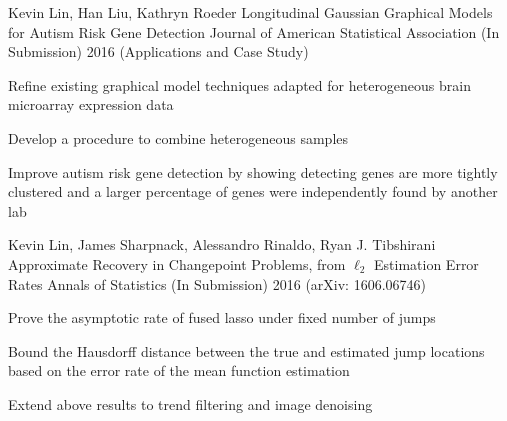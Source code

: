 

\begin{cventries}

\cventry
    {Kevin Lin, Han Liu, Kathryn Roeder} %
    {Longitudinal Gaussian Graphical Models for Autism Risk Gene Detection}
    {Journal of American Statistical Association (In Submission)} %
    {2016 (Applications and Case Study)} %
    {
      \begin{cvitems} %
        \item {Refine existing graphical model techniques adapted for heterogeneous brain microarray expression data}
        \item {Develop a procedure to combine heterogeneous samples}
        \item {Improve autism risk gene detection by showing detecting genes are more tightly clustered
        and a larger percentage of genes were independently found by another lab}
      \end{cvitems}
    }


  \cventry
    {Kevin Lin, James Sharpnack, Alessandro Rinaldo, Ryan J. Tibshirani} %
    {Approximate Recovery in Changepoint Problems, from $\ell_2$
    Estimation Error Rates}
    {Annals of Statistics (In Submission)} %
    {2016 (arXiv: 1606.06746)} %
    {
      \begin{cvitems} %
        \item {Prove the asymptotic rate of fused lasso under fixed number of jumps}
        \item {Bound the Hausdorff distance between the true
        and estimated jump locations based on the error rate of the
        mean function estimation}
        \item {Extend above results to trend filtering and image denoising}
      \end{cvitems}
    }


\end{cventries}
